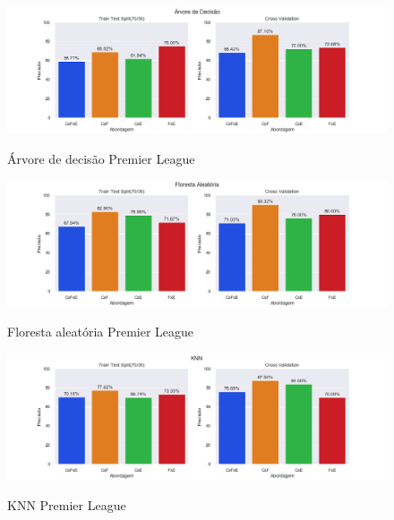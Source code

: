 \begin{figure}[htbp]
  \begin{center}
  \includegraphics[width=1.05\linewidth]{imagens/resultados/arvore_decisao_pl.png}\\
  \end{center}
  \caption[Árvore de decisão Premier League]{Árvore de decisão Premier League}
  \label{fig:logo}
\end{figure}

\begin{figure}[htbp]
  \begin{center}
  \includegraphics[width=1.05\linewidth]{imagens/resultados/floresta_aleatoria_pl.png}\\
  \end{center}
  \caption[Floresta aleatória Premier League]{Floresta aleatória Premier League}
  \label{fig:logo}
\end{figure}

\begin{figure}[htbp]
  \begin{center}
  \includegraphics[width=1.05\linewidth]{imagens/resultados/knn_pl.png}\\
  \end{center}
  \caption[KNN Premier League]{KNN Premier League}
  \label{fig:logo}
\end{figure}

